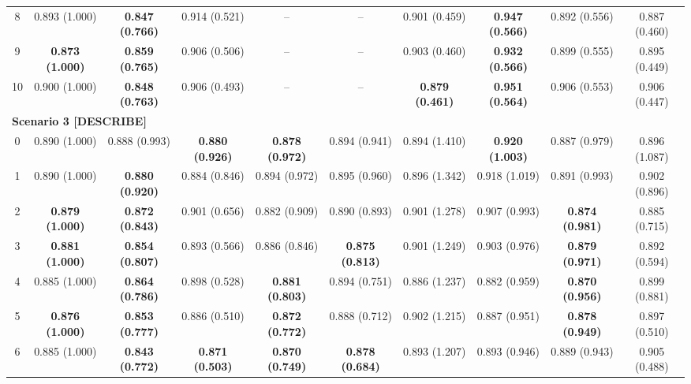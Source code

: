 \begin{table}[!h]
{\begin{tabular}[t]{|c|ccccccccc|}
\hspace{1em}8 & 0.893 (1.000) & \textbf{0.847 (0.766)} & 0.914 (0.521) & -- & -- & 0.901 (0.459) & \textbf{0.947 (0.566)} & 0.892 (0.556) & 0.887 (0.460)\\
\hspace{1em}9 & \textbf{0.873 (1.000)} & \textbf{0.859 (0.765)} & 0.906 (0.506) & -- & -- & 0.903 (0.460) & \textbf{0.932 (0.566)} & 0.899 (0.555) & 0.895 (0.449)\\
\hspace{1em}10 & 0.900 (1.000) & \textbf{0.848 (0.763)} & 0.906 (0.493) & -- & -- & \textbf{0.879 (0.461)} & \textbf{0.951 (0.564)} & 0.906 (0.553) & 0.906 (0.447)\\
\hline
\multicolumn{10}{|l|}{\textbf{Scenario 3 [DESCRIBE]}}\\
\hspace{1em}0 & 0.890 (1.000) & 0.888 (0.993) & \textbf{0.880 (0.926)} & \textbf{0.878 (0.972)} & 0.894 (0.941) & 0.894 (1.410) & \textbf{0.920 (1.003)} & 0.887 (0.979) & 0.896 (1.087)\\
\hspace{1em}1 & 0.890 (1.000) & \textbf{0.880 (0.920)} & 0.884 (0.846) & 0.894 (0.972) & 0.895 (0.960) & 0.896 (1.342) & 0.918 (1.019) & 0.891 (0.993) & 0.902 (0.896)\\
\hspace{1em}2 & \textbf{0.879 (1.000)} & \textbf{0.872 (0.843)} & 0.901 (0.656) & 0.882 (0.909) & 0.890 (0.893) & 0.901 (1.278) & 0.907 (0.993) & \textbf{0.874 (0.981)} & 0.885 (0.715)\\
\hspace{1em}3 & \textbf{0.881 (1.000)} & \textbf{0.854 (0.807)} & 0.893 (0.566) & 0.886 (0.846) & \textbf{0.875 (0.813)} & 0.901 (1.249) & 0.903 (0.976) & \textbf{0.879 (0.971)} & 0.892 (0.594)\\
\hspace{1em}4 & 0.885 (1.000) & \textbf{0.864 (0.786)} & 0.898 (0.528) & \textbf{0.881 (0.803)} & 0.894 (0.751) & 0.886 (1.237) & 0.882 (0.959) & \textbf{0.870 (0.956)} & 0.899 (0.881)\\
\hspace{1em}5 & \textbf{0.876 (1.000)} & \textbf{0.853 (0.777)} & 0.886 (0.510) & \textbf{0.872 (0.772)} & 0.888 (0.712) & 0.902 (1.215) & 0.887 (0.951) & \textbf{0.878 (0.949)} & 0.897 (0.510)\\
\hspace{1em}6 & 0.885 (1.000) & \textbf{0.843 (0.772)} & \textbf{0.871 (0.503)} & \textbf{0.870 (0.749)} & \textbf{0.878 (0.684)} & 0.893 (1.207) & 0.893 (0.946) & 0.889 (0.943) & 0.905 (0.488)\\

\end{tabular}}
\end{table}
